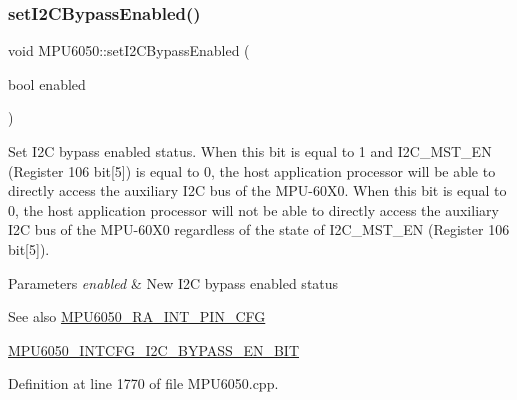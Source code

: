 \subsubsection{\texorpdfstring{setI2CBypassEnabled()}{setI2CBypassEnabled()}}
{\footnotesize\ttfamily void M\+P\+U6050\+::set\+I2\+C\+Bypass\+Enabled (\begin{DoxyParamCaption}\item[{bool}]{enabled }\end{DoxyParamCaption})}

Set I2C bypass enabled status. When this bit is equal to 1 and I2\+C\+\_\+\+M\+S\+T\+\_\+\+EN (Register 106 bit\mbox{[}5\mbox{]}) is equal to 0, the host application processor will be able to directly access the auxiliary I2C bus of the M\+P\+U-\/60\+X0. When this bit is equal to 0, the host application processor will not be able to directly access the auxiliary I2C bus of the M\+P\+U-\/60\+X0 regardless of the state of I2\+C\+\_\+\+M\+S\+T\+\_\+\+EN (Register 106 bit\mbox{[}5\mbox{]}). 
\begin{DoxyParams}{Parameters}
{\em enabled} & New I2C bypass enabled status \\
\hline
\end{DoxyParams}
\begin{DoxySeeAlso}{See also}
\mbox{\hyperlink{MPU6050_8h_a82344e1daef2bac2e0d938319528be6c}{M\+P\+U6050\+\_\+\+R\+A\+\_\+\+I\+N\+T\+\_\+\+P\+I\+N\+\_\+\+C\+FG}} 

\mbox{\hyperlink{MPU6050_8h_ab3dd639412ccf5b69cfb66346d0b6b99}{M\+P\+U6050\+\_\+\+I\+N\+T\+C\+F\+G\+\_\+\+I2\+C\+\_\+\+B\+Y\+P\+A\+S\+S\+\_\+\+E\+N\+\_\+\+B\+IT}} 
\end{DoxySeeAlso}


Definition at line 1770 of file M\+P\+U6050.\+cpp.


\begin{DoxyCode}{0}

\end{DoxyCode}
\mbox{\label{classMPU6050_a6503f0fdfefa0fd287a75032667b7b69}} 
